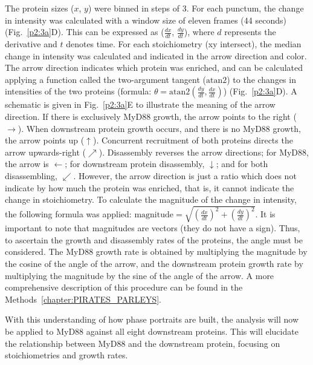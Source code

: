 The protein sizes ($x$, $y$) were binned in steps of 3\times. For each punctum, the change in intensity was calculated with a window size of eleven frames (44 seconds) (Fig.~\ref{p2:3a}D). This can be expressed as ($\frac{dx}{dt}$, $\frac{dy}{dt}$), where $d$ represents the derivative and $t$ denotes time. For each stoichiometry (xy intersect), the median change in intensity was calculated and indicated in the arrow direction and color. The arrow direction indicates which protein was enriched, and can be calculated applying a function called the two-argument tangent ($\text{atan2}$) to the changes in intensities of the two proteins (formula: $\theta = \text{atan2}(\frac{dy}{dt}, \frac{dx}{dt})$) (Fig.~\ref{p2:3a}D). A schematic is given in Fig.~\ref{p2:3a}E to illustrate the meaning of the arrow direction. If there is exclusively MyD88 growth, the arrow points to the right ($\rightarrow$). When downstream protein growth occurs, and there is no MyD88 growth, the arrow points up ($\uparrow$). Concurrent recruitment of both proteins directs the arrow upwards-right ($\nearrow$). Disassembly reverses the arrow directions; for MyD88, the arrow is $\leftarrow$; for downstream protein disassembly, $\downarrow$; and for both disassembling, $\swarrow$. However, the arrow direction is just a ratio which does not indicate by how much the protein was enriched, that is, it cannot indicate the change in stoichiometry. To calculate the magnitude of the change in intensity, the following formula was applied: $\text{magnitude} = \sqrt{(\frac{dx}{dt})^2 + (\frac{dy}{dt})^2}$. It is important to note that magnitudes are vectors (they do not have a sign). Thus, to ascertain the growth and disassembly rates of the proteins, the angle must be considered. The MyD88 growth rate is obtained by multiplying the magnitude by the cosine of the angle of the arrow, and the downstream protein growth rate by multiplying the magnitude by the sine of the angle of the arrow. A more comprehensive description of this procedure can be found in the Methods~\ref{chapter:PIRATES_PARLEYS}.

With this understanding of how phase portraits are built, the analysis will now be applied to MyD88 against all eight downstream proteins. This will elucidate the relationship between MyD88 and the downstream protein, focusing on stoichiometries and growth rates.


